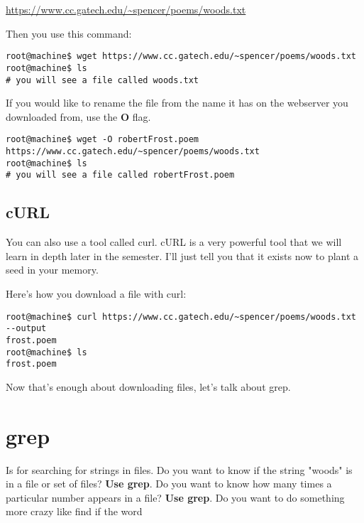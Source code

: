 \documentclass[12pt,a4paper]{article}
\begin{document}
\url{https://www.cc.gatech.edu/~spencer/poems/woods.txt}\newline

Then you use this command:
\begin{lstlisting}[style=term]
root@machine$ wget https://www.cc.gatech.edu/~spencer/poems/woods.txt
root@machine$ ls
# you will see a file called woods.txt
\end{lstlisting}

If you would like to rename the file from the name it has on the webserver you
downloaded from, use the \textbf{O} flag.


\begin{lstlisting}[style=term]
root@machine$ wget -O robertFrost.poem  https://www.cc.gatech.edu/~spencer/poems/woods.txt
root@machine$ ls
# you will see a file called robertFrost.poem
\end{lstlisting}

\noindent{}


\subsection{cURL}

You can also use a tool called curl. cURL is a very powerful tool that we will
learn in depth later in the semester. I'll just tell you that it exists now to
plant a seed in your memory.

Here's how you download a file with curl:

\begin{lstlisting}[style=term]
root@machine$ curl https://www.cc.gatech.edu/~spencer/poems/woods.txt --output
frost.poem
root@machine$ ls
frost.poem
\end{lstlisting}

Now that's enough about downloading files, let's talk about grep.

\section{grep}
Is for searching for strings in files. Do you want to know if the string "woods"
is in a file or set of files? \textbf{Use grep}. Do you want to know how many
times a particular number appears in a file? \textbf{Use grep}. Do you want to
do something more crazy like find if the word
\end{document}
